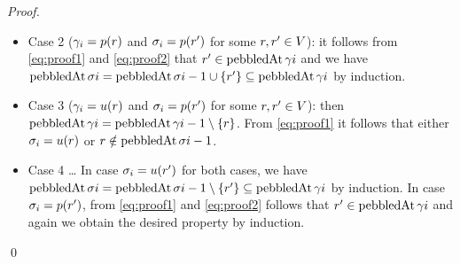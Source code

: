 \begin{proof}
\begin{itemize}
\begin{itemize}

\item Case 2 ($\gamma_i = p(r)$ and $\sigma_i = p(r')$ for some $r, r' \in V$): it follows from \ref{eq:proof1} and \ref{eq:proof2} that $r' \in \operatorname{pebbledAt}{\gamma}{i}$ and we have $\operatorname{pebbledAt}{\sigma}{i} = \operatorname{pebbledAt}{\sigma}{i-1} \cup \{r'\} \subseteq \operatorname{pebbledAt}{\gamma}{i}$ by induction.

\item Case 3 ($\gamma_i = u(r)$ and $\sigma_i = p(r')$ for some $r, r' \in V$): then $\operatorname{pebbledAt}{\gamma}{i} = \operatorname{pebbledAt}{\gamma}{i-1} \setminus \{r\}$.
From \ref{eq:proof1} it follows that either $\sigma_i = u(r)$ or $r \notin \operatorname{pebbledAt}{\sigma}{i-1}$.

\item Case 4 \ldots
In case $\sigma_i = u(r')$ for both cases, we have $\operatorname{pebbledAt}{\sigma}{i} = \operatorname{pebbledAt}{\sigma}{i-1} \setminus \{r'\} \subseteq \operatorname{pebbledAt}{\gamma}{i}$ by induction.
In case $\sigma_i = p(r')$, from \ref{eq:proof1} and \ref{eq:proof2} follows that $r' \in \operatorname{pebbledAt}{\gamma}{i}$ and again we obtain the desired property by induction.
\end{itemize}

\end{itemize}

%

\hfill \qed
\end{proof}

